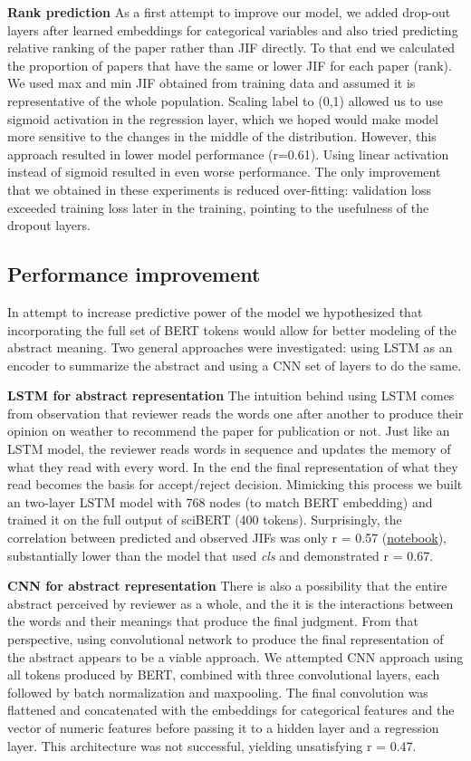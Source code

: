 \documentclass[11pt]{article}
\begin{document}
\textbf{Rank prediction} As a first attempt to improve our model, we added drop-out layers after learned embeddings for categorical variables and also tried predicting relative ranking of the paper rather than JIF directly. To that end we calculated the proportion of papers that have the same or lower JIF for each paper (rank). We used max and min JIF obtained from training data and assumed it is representative of the whole population. Scaling label to (0,1) allowed us to use sigmoid activation in the regression layer, which we hoped would make model more sensitive to the changes in the middle of the distribution. However, this approach resulted in lower model performance (r=0.61). Using linear activation instead of sigmoid resulted in even worse performance. The only improvement that we obtained in these experiments is reduced over-fitting: validation loss exceeded training loss later in the training, pointing to the usefulness of the dropout layers.

\subsection{Performance improvement}
In attempt to increase predictive power of the model we hypothesized that incorporating the full set of BERT tokens would allow for better modeling of the abstract meaning. Two general approaches were investigated: using LSTM as an encoder to summarize the abstract and using a CNN set of layers to do the same.

\textbf{LSTM for abstract representation} The intuition behind using LSTM comes from observation that reviewer reads the words one after another to produce their opinion on weather to recommend the paper for publication or not. Just like an LSTM model, the reviewer reads words in sequence and updates the memory of what they read with every word. In the end the final representation of what they read becomes the basis for accept/reject decision. Mimicking this process we built an two-layer LSTM model with 768 nodes (to match BERT embedding) and trained it on the full output of sciBERT (400 tokens). Surprisingly, the correlation between predicted and observed JIFs was only r = 0.57 (\href{https://github.com/ArtemChemist/w266_project/blob/main/Notebooks/sciBERT%20w%20meta%20to%20LSTM.ipynb}{notebook}), substantially lower than the model that used \textit{cls} and demonstrated r = 0.67.

\textbf{CNN for abstract representation} There is also a possibility that the entire abstract perceived by reviewer as a whole, and the it is the interactions between the words and their meanings that produce the final judgment. From that perspective, using convolutional network to produce the final representation of the abstract appears to be a viable approach. We attempted CNN approach using all tokens produced by BERT, combined with three convolutional layers, each followed by batch normalization and maxpooling. The final convolution was flattened and concatenated with the embeddings for categorical features and the vector of numeric features before passing it to a hidden layer and a regression layer. This architecture was not successful, yielding unsatisfying r = 0.47.    
\end{document}
